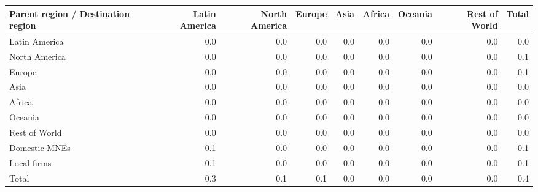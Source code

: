 \begin{tabular}{lrrrrrrrr}
\toprule
Parent region / Destination region & Latin America & North America & Europe & Asia & Africa & Oceania & Rest of World & Total \\
\midrule
Latin America & 0.0 & 0.0 & 0.0 & 0.0 & 0.0 & 0.0 & 0.0 & 0.0 \\
North America & 0.0 & 0.0 & 0.0 & 0.0 & 0.0 & 0.0 & 0.0 & 0.1 \\
Europe & 0.0 & 0.0 & 0.0 & 0.0 & 0.0 & 0.0 & 0.0 & 0.1 \\
Asia & 0.0 & 0.0 & 0.0 & 0.0 & 0.0 & 0.0 & 0.0 & 0.0 \\
Africa & 0.0 & 0.0 & 0.0 & 0.0 & 0.0 & 0.0 & 0.0 & 0.0 \\
Oceania & 0.0 & 0.0 & 0.0 & 0.0 & 0.0 & 0.0 & 0.0 & 0.0 \\
Rest of World & 0.0 & 0.0 & 0.0 & 0.0 & 0.0 & 0.0 & 0.0 & 0.0 \\
Domestic MNEs & 0.1 & 0.0 & 0.0 & 0.0 & 0.0 & 0.0 & 0.0 & 0.1 \\
Local firms & 0.1 & 0.0 & 0.0 & 0.0 & 0.0 & 0.0 & 0.0 & 0.1 \\
\midrule
Total & 0.3 & 0.1 & 0.1 & 0.0 & 0.0 & 0.0 & 0.0 & 0.4 \\
\bottomrule
\end{tabular}
